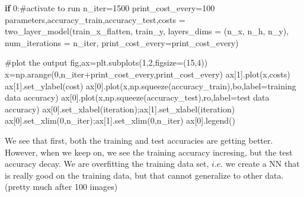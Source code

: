 \documentclass[
  letterpaper,
  DIV=11,
  numbers=noendperiod]{scrartcl}
\newenvironment{Shaded}{\begin{snugshade}}{\end{snugshade}}
\newcommand{\CommentTok}[1]{\textcolor[rgb]{0.37,0.37,0.37}{#1}}
\newcommand{\ControlFlowTok}[1]{\textcolor[rgb]{0.00,0.23,0.31}{\textbf{#1}}}
\newcommand{\DecValTok}[1]{\textcolor[rgb]{0.68,0.00,0.00}{#1}}
\newcommand{\NormalTok}[1]{\textcolor[rgb]{0.00,0.23,0.31}{#1}}
\newcommand{\OperatorTok}[1]{\textcolor[rgb]{0.37,0.37,0.37}{#1}}
\newcommand{\StringTok}[1]{\textcolor[rgb]{0.13,0.47,0.30}{#1}}
\begin{document}
\begin{Shaded}
\begin{Highlighting}[]
\ControlFlowTok{if} \DecValTok{0}\NormalTok{:}\CommentTok{\#activate to run}
\NormalTok{    n\_iter}\OperatorTok{=}\DecValTok{1500}
\NormalTok{    print\_cost\_every}\OperatorTok{=}\DecValTok{100}
\NormalTok{    parameters,accuracy\_train,accuracy\_test,costs }\OperatorTok{=}\NormalTok{ two\_layer\_model(train\_x\_flatten, train\_y, layers\_dims }\OperatorTok{=}\NormalTok{ (n\_x, n\_h, n\_y), num\_iterations }\OperatorTok{=}\NormalTok{ n\_iter, print\_cost\_every}\OperatorTok{=}\NormalTok{print\_cost\_every)}

    \CommentTok{\#plot the output}
\NormalTok{    fig,ax}\OperatorTok{=}\NormalTok{plt.subplots(}\DecValTok{1}\NormalTok{,}\DecValTok{2}\NormalTok{,figsize}\OperatorTok{=}\NormalTok{(}\DecValTok{15}\NormalTok{,}\DecValTok{4}\NormalTok{))}
\NormalTok{    x}\OperatorTok{=}\NormalTok{np.arange(}\DecValTok{0}\NormalTok{,n\_iter}\OperatorTok{+}\NormalTok{print\_cost\_every,print\_cost\_every)}
\NormalTok{    ax[}\DecValTok{1}\NormalTok{].plot(x,costs)}
\NormalTok{    ax[}\DecValTok{1}\NormalTok{].set\_ylabel(}\StringTok{\textquotesingle{}cost\textquotesingle{}}\NormalTok{)}
\NormalTok{    ax[}\DecValTok{0}\NormalTok{].plot(x,np.squeeze(accuracy\_train),}\StringTok{\textquotesingle{}bo\textquotesingle{}}\NormalTok{,label}\OperatorTok{=}\StringTok{\textquotesingle{}training data accuracy\textquotesingle{}}\NormalTok{)}
\NormalTok{    ax[}\DecValTok{0}\NormalTok{].plot(x,np.squeeze(accuracy\_test),}\StringTok{\textquotesingle{}ro\textquotesingle{}}\NormalTok{,label}\OperatorTok{=}\StringTok{\textquotesingle{}test data accuracy\textquotesingle{}}\NormalTok{)}
\NormalTok{    ax[}\DecValTok{0}\NormalTok{].set\_xlabel(}\StringTok{\textquotesingle{}iteration\textquotesingle{}}\NormalTok{)}\OperatorTok{;}\NormalTok{ax[}\DecValTok{1}\NormalTok{].set\_xlabel(}\StringTok{\textquotesingle{}iteration\textquotesingle{}}\NormalTok{)}
\NormalTok{    ax[}\DecValTok{0}\NormalTok{].set\_xlim(}\DecValTok{0}\NormalTok{,n\_iter)}\OperatorTok{;}\NormalTok{ax[}\DecValTok{1}\NormalTok{].set\_xlim(}\DecValTok{0}\NormalTok{,n\_iter)}
\NormalTok{    ax[}\DecValTok{0}\NormalTok{].legend()}
\end{Highlighting}
\end{Shaded}

We see that first, both the training and test accuracies are getting
better. However, when we keep on, we see the training accuracy
incresing, but the test accuracy decay. We are overfitting the training
data set, \(\textit{i.e.}\) we create a NN that is really good on the
training data, but that cannot generalize to other data. (pretty much
after 100 images)
\end{document}
